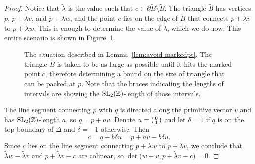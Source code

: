 \documentclass[pdftex]{sigma}
\numberwithin{equation}{section}
\newenvironment{psmallmatrix}
 {\left(\begin{smallmatrix}}
 {\end{smallmatrix}\right)}
\newcommand{\triangleline}{dashed}
\def\Z{{\mathbb Z}}
\newcommand{\De}{\Delta}
\newcommand{\SL}{{\rm SL}_2(\Z)}
\newcommand{\vect}[2]{\begin{psmallmatrix} #1 \\ #2 \end{psmallmatrix}}
\begin{document}
\begin{proof}
Notice that $\widetilde{\lambda}$ is the value such that
$c\in\partial \widetilde{B}\setminus\widetilde{B}$.
The triangle $\widetilde{B}$ has vertices $p$, $p+\widetilde{\lambda} v$, and $p+\widetilde{\lambda}w$, and the point $c$ lies on the edge of $\widetilde{B}$ that connects $p+\widetilde{\lambda} v$ to $p+\widetilde{\lambda}w$. This is enough to determine the value of $\widetilde{\lambda}$, which we do now.
This entire scenario is shown in Figure~\ref{fig:one_cut}.

\begin{figure}[t]
\begin{center}
 \caption{The situation described in Lemma~\ref{lem:avoid-markedpt}. The triangle $\widetilde{B}$ is taken to be as large as possible until it hits the marked point $c$, therefore determining a bound on the size of triangle that can be packed at $p$. Note that the braces indicating the lengths of intervals are showing the $\SL$-length of those intervals.} \label{fig:one_cut}
 \end{center}
\end{figure}

The line segment connecting $p$ with $q$ is directed along the primitive vector $v$ and has $\SL$-length $a$, so $q = p+av$.
Denote $u = \vect{0}{1}$ and let $\delta = 1$ if $q$ is on the top boundary of $\De$ and $\delta = -1$ otherwise. Then
\[
 c = q-b\delta u = p+av - b\delta u.
\]
Since $c$ lies on the line segment connecting $p+\widetilde{\lambda}w$ to $p+\widetilde{\lambda}v$, we conclude that $\widetilde{\lambda}w - \widetilde{\lambda}v$ and $p+\widetilde{\lambda}v-c$ are colinear, so $\det\big(w-v, p+\widetilde{\lambda}v-c\big)=0$.


\end{proof}
\end{document}
